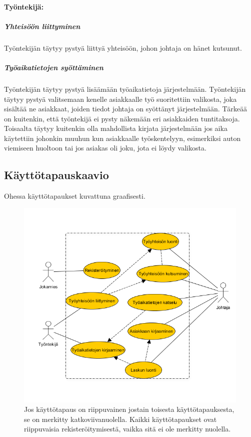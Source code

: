 \documentclass[a4paper, 12pt finnish]{article}
\begin{document}
\paragraph{Työntekijä:}
\subparagraph{Yhteisöön liittyminen} Työntekijän täytyy pystyä liittyä
yhteisöön, johon johtaja on hänet kutsunut.
\subparagraph{Työaikatietojen syöttäminen} Työntekijän täytyy pystyä
lisäämään työaikatietoja järjestelmään. Työntekijän täytyy pystyä
valitsemaan kenelle asiakkaalle työ suoritettiin valikosta, joka sisältää
ne asiakkaat, joiden tiedot johtaja on syöttänyt järjestelmään. Tärkeää
on kuitenkin, että työntekijä ei pysty näkemään eri asiakkaiden
tuntitaksoja. Toisaalta täytyy kuitenkin olla mahdollista kirjata
järjestelmään jos aika käytettiin johonkin muuhun kun asiakkaalle
työskentelyyn, esimerkiksi auton viemiseen huoltoon tai jos asiakas oli
joku, jota ei löydy valikosta.

\subsection{Käyttötapauskaavio} Ohessa käyttötapaukset kuvattuna
graafisesti.

\begin{figure}[htbp]
    \centering
    \includegraphics[width=1\textwidth]{graafi.png}
    \caption{\small Jos käyttötapaus on riippuvainen jostain toisesta
    käyttötapauksesta, se on merkitty katkoviivanuolella. Kaikki
käyttötapaukset ovat riippuvaisia rekisteröitymisestä, vaikka sitä
ei ole merkitty nuolella.}
\end{figure}
\newpage
\end{document}
